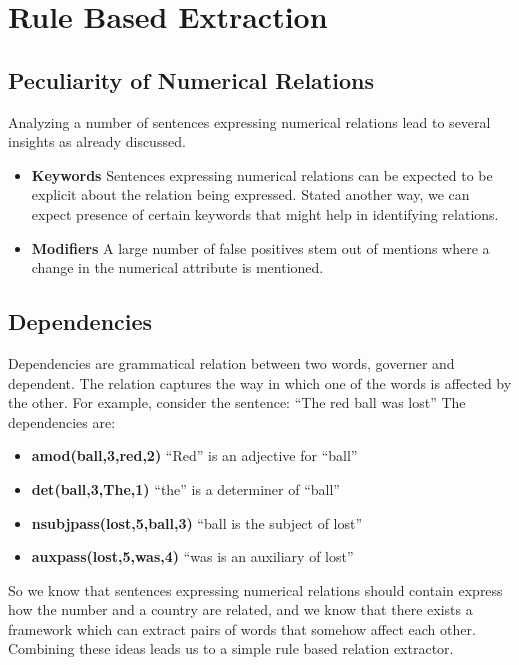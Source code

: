 \documentclass[a4paper,10pt]{article}
\begin{document}
\section{Rule Based Extraction}

\subsection{Peculiarity of Numerical Relations}
Analyzing a number of sentences expressing numerical relations lead to several insights as already discussed.
\begin{itemize}
 \item \textbf{Keywords} Sentences expressing numerical relations can be expected to be explicit about the relation being expressed.
 Stated another way, we can expect presence of certain keywords that might help in identifying relations.
 \item \textbf{Modifiers} A large number of false positives stem out of mentions where a change in the numerical attribute is mentioned.
\end{itemize}

\subsection{Dependencies}
Dependencies are grammatical relation between two words, governer and dependent.
The relation captures the way in which one of the words is affected by the other.
For example, consider the sentence:
``The red ball was lost''
The dependencies are:
\begin{itemize}

\item \textbf{amod(ball,3,red,2)} ``Red'' is an adjective for ``ball''
\item \textbf{det(ball,3,The,1)}  ``the'' is a determiner of ``ball''
\item \textbf{nsubjpass(lost,5,ball,3)}	``ball is the subject of lost''
\item \textbf{auxpass(lost,5,was,4)}	``was is an auxiliary of lost''
\end {itemize}

So we know that sentences expressing numerical relations should contain express how the number and a country
are related, and we know that there exists a framework which can extract pairs of words that somehow affect each other.
Combining these ideas leads us to a simple rule based relation extractor.
\end{document}
